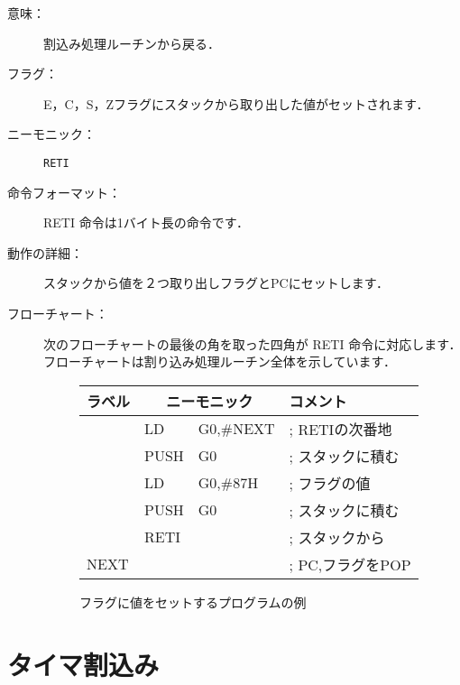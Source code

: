 \begin{description}
\item[意味：]割込み処理ルーチンから戻る．

\item[フラグ：]E，C，S，Zフラグにスタックから取り出した値がセットされます．

\item[ニーモニック：] {\tt RETI}

\item[命令フォーマット：]RETI 命令は1バイト長の命令です．


\item[動作の詳細：]スタックから値を２つ取り出しフラグとPCにセットします．

\item[フローチャート：]
次のフローチャートの最後の角を取った四角が RETI 命令に対応します．
フローチャートは割り込み処理ルーチン全体を示しています．

\begin{center}
\end{center}

\begin{figure}[btp]
{\small\tt\begin{center}
\begin{tabular}{|l|l l l|} \hline
ラベル & \multicolumn{2}{|c}{ニーモニック} & コメント      \\
\hline
      & LD    & G0,\#NEXT         & ; RETIの次番地   \\
      & PUSH  & G0                & ; スタックに積む \\
      & LD    & G0,\#87H          & ; フラグの値     \\
      & PUSH  & G0                & ; スタックに積む \\
      & RETI  &                   & ; スタックから   \\
NEXT  &       &                   & ; PC,フラグをPOP \\
\hline
\end{tabular}
\end{center}}
\caption{フラグに値をセットするプログラムの例}
\label{fig:chap6:flag}
\end{figure}

\end{description}

\newpage
\section{タイマ割込み}

